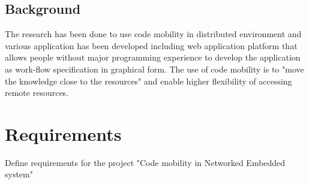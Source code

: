 \documentclass{scrreprt}
\begin{document}
	\section{Background}
\noindent

The research has been done to use code mobility in distributed environment \cite{Bart1} and various application has been developed including \cite{Bart2} web application platform that allows people without major programming experience to develop the application as work-flow specification in graphical form. The use of code mobility is to "move the knowledge close to the resources" \cite{Picco} and enable higher flexibility of accessing remote resources.


\chapter{Requirements}	

Define requirements for the project "Code mobility in Networked Embedded system"

\renewcommand{\labelenumi}{\arabic{enumi}}
\renewcommand{\labelenumii}{\arabic{enumi}.\arabic{enumii}}
\end{document}
